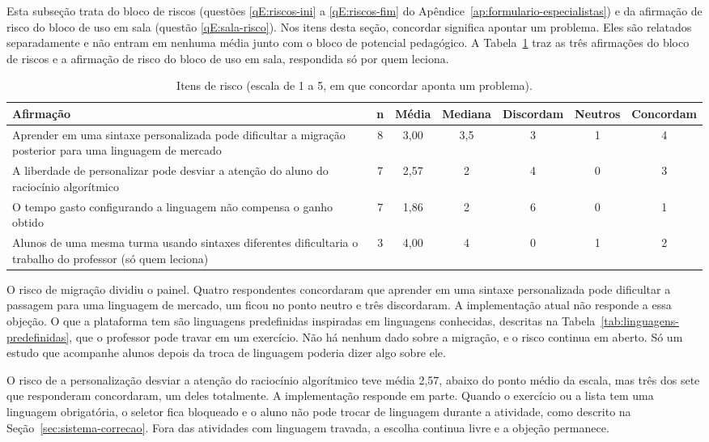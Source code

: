 Esta subseção trata do bloco de riscos (questões \ref{qE:riscos-ini} a \ref{qE:riscos-fim} do Apêndice~\ref{ap:formulario-especialistas}) e da afirmação de risco do bloco de uso em sala (questão \ref{qE:sala-risco}). Nos itens desta seção, concordar significa apontar um problema. Eles são relatados separadamente e não entram em nenhuma média junto com o bloco de potencial pedagógico. A Tabela~\ref{tab:resultado-riscos} traz as três afirmações do bloco de riscos e a afirmação de risco do bloco de uso em sala, respondida só por quem leciona.

\begin{table}[htbp]
\centering
\caption{Itens de risco (escala de 1 a 5, em que concordar aponta um problema).}
\label{tab:resultado-riscos}
\footnotesize
\renewcommand{\arraystretch}{1.2}
\begin{tabular}{|p{5.8cm}|c|c|c|c|c|c|}
\hline
\textbf{Afirmação} & \textbf{n} & \textbf{Média} & \textbf{Mediana} & \textbf{Discordam} & \textbf{Neutros} & \textbf{Concordam} \\\hline
Aprender em uma sintaxe personalizada pode dificultar a migração posterior para uma linguagem de mercado & 8 & 3,00 & 3,5 & 3 & 1 & 4 \\\hline
A liberdade de personalizar pode desviar a atenção do aluno do raciocínio algorítmico & 7 & 2,57 & 2 & 4 & 0 & 3 \\\hline
O tempo gasto configurando a linguagem não compensa o ganho obtido & 7 & 1,86 & 2 & 6 & 0 & 1 \\\hline
Alunos de uma mesma turma usando sintaxes diferentes dificultaria o trabalho do professor (só quem leciona) & 3 & 4,00 & 4 & 0 & 1 & 2 \\\hline
\end{tabular}
\end{table}

O risco de migração dividiu o painel. Quatro respondentes concordaram que aprender em uma sintaxe personalizada pode dificultar a passagem para uma linguagem de mercado, um ficou no ponto neutro e três discordaram. A implementação atual não responde a essa objeção. O que a plataforma tem são linguagens predefinidas inspiradas em linguagens conhecidas, descritas na Tabela~\ref{tab:linguagens-predefinidas}, que o professor pode travar em um exercício. Não há nenhum dado sobre a migração, e o risco continua em aberto. Só um estudo que acompanhe alunos depois da troca de linguagem poderia dizer algo sobre ele.

O risco de a personalização desviar a atenção do raciocínio algorítmico teve média 2,57, abaixo do ponto médio da escala, mas três dos sete que responderam concordaram, um deles totalmente. A implementação responde em parte. Quando o exercício ou a lista tem uma linguagem obrigatória, o seletor fica bloqueado e o aluno não pode trocar de linguagem durante a atividade, como descrito na Seção~\ref{sec:sistema-correcao}. Fora das atividades com linguagem travada, a escolha continua livre e a objeção permanece.

